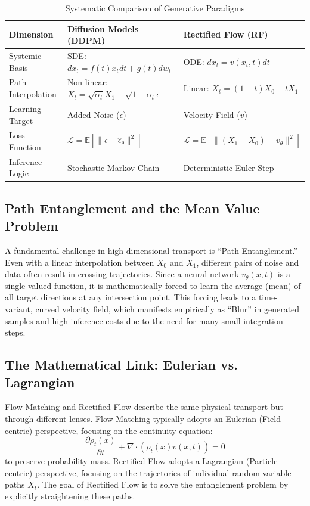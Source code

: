 \documentclass[11pt,a4paper]{article}
\begin{document}
\begin{table}[h]
\centering
\caption{Systematic Comparison of Generative Paradigms}
\label{tab:paradigms}
\vspace{0.2cm}
\small
\begin{tabular}{lll}
\toprule
\textbf{Dimension} & \textbf{Diffusion Models (DDPM)} & \textbf{Rectified Flow (RF)} \\
\midrule
Systemic Basis & SDE: $dx_t = f(t)x_t dt + g(t)dw_t$ & ODE: $dx_t = v(x_t, t)dt$ \\
\addlinespace
Path Interpolation & Non-linear: $X_t = \sqrt{\bar{\alpha}_t} X_1 + \sqrt{1 - \bar{\alpha}_t} \epsilon$ & Linear: $X_t = (1 - t)X_0 + tX_1$ \\
\addlinespace
Learning Target & Added Noise ($\epsilon$) & Velocity Field ($v$) \\
\addlinespace
Loss Function & $\mathcal{L} = \mathbb{E} \left[ \| \epsilon - \hat{\epsilon}_\theta \|^2 \right]$ & $\mathcal{L} = \mathbb{E} \left[ \| (X_1 - X_0) - v_\theta \|^2 \right]$ \\
\addlinespace
Inference Logic & Stochastic Markov Chain & Deterministic Euler Step \\
\bottomrule
\end{tabular}
\end{table}

\subsection{Path Entanglement and the Mean Value Problem}
A fundamental challenge in high-dimensional transport is ``Path Entanglement.'' Even with a linear interpolation between $X_0$ and $X_1$, different pairs of noise and data often result in crossing trajectories. Since a neural network $v_\theta(x, t)$ is a single-valued function, it is mathematically forced to learn the average (mean) of all target directions at any intersection point. This forcing leads to a time-variant, curved velocity field, which manifests empirically as ``Blur'' in generated samples and high inference costs due to the need for many small integration steps.

\subsection{The Mathematical Link: Eulerian vs. Lagrangian}
Flow Matching and Rectified Flow describe the same physical transport but through different lenses. Flow Matching typically adopts an Eulerian (Field-centric) perspective, focusing on the continuity equation:
\begin{equation}
\frac{\partial \rho_t(x)}{\partial t} + \nabla \cdot (\rho_t(x)v(x, t)) = 0
\end{equation}
to preserve probability mass. Rectified Flow adopts a Lagrangian (Particle-centric) perspective, focusing on the trajectories of individual random variable paths $X_t$. The goal of Rectified Flow is to solve the entanglement problem by explicitly straightening these paths.
\end{document}
